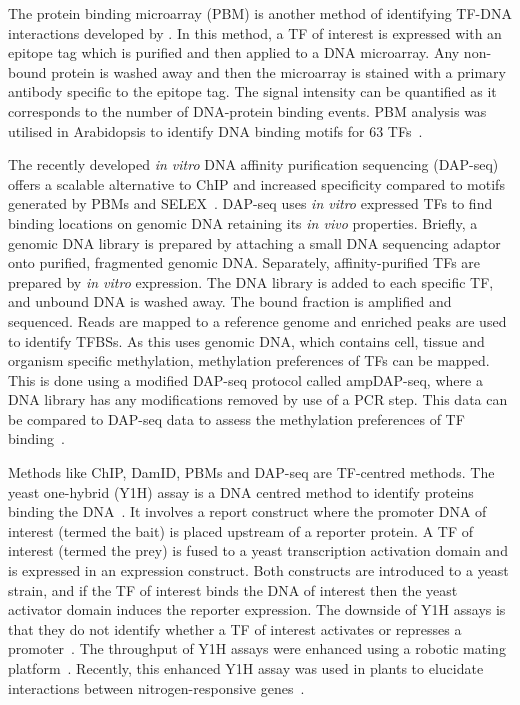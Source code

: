 The protein binding microarray (PBM) is another method of identifying TF-DNA interactions developed by \textcite*{bulykProteinBindingMicroarrays2007}. In this method, a TF of interest is expressed with an epitope tag which is purified and then applied to a DNA microarray. Any non-bound protein is washed away and then the microarray is stained with a primary antibody specific to the epitope tag. The signal intensity can be quantified as it corresponds to the number of DNA-protein binding events. PBM analysis was utilised in Arabidopsis to identify DNA binding motifs for 63 TFs~\autocite{franco-zorrillaDNAbindingSpecificitiesPlant2014}.

The recently developed \textit{in vitro} DNA affinity purification sequencing (DAP-seq) offers a scalable alternative to ChIP and increased specificity compared to motifs generated by PBMs and SELEX~\autocite{omalleyCistromeEpicistromeFeatures2016}.
DAP\hyp{}seq uses \textit{in vitro} expressed TFs to find binding locations on genomic DNA retaining its \textit{in vivo} properties.
Briefly, a genomic DNA library is prepared by attaching a small DNA sequencing adaptor onto purified, fragmented genomic DNA.
Separately, affinity\hyp{}purified TFs are prepared by \textit{in vitro} expression.
The DNA library is added to each specific TF, and unbound DNA is washed away.
The bound fraction is amplified and sequenced.
Reads are mapped to a reference genome and enriched peaks are used to identify TFBSs.
As this uses genomic DNA, which contains cell, tissue and organism specific methylation, methylation preferences of TFs can be mapped.
This is done using a modified DAP\hyp{}seq protocol called ampDAP\hyp{}seq, where a DNA library has any modifications removed by use of a PCR step.
This data can be compared to DAP\hyp{}seq data to assess the methylation preferences of TF binding~\autocite{omalleyCistromeEpicistromeFeatures2016}.

Methods like ChIP, DamID, PBMs and DAP-seq are TF\hyp{}centred methods.
The yeast one\hyp{}hybrid (Y1H) assay is a DNA centred method to identify proteins binding the DNA~\autocite{liIsolationORC6Component1993}.
It involves a report construct where the promoter DNA of interest (termed the bait) is placed upstream of a reporter protein.
A TF of interest (termed the prey) is fused to a yeast transcription activation domain and is expressed in an expression construct.
Both constructs are introduced to a yeast strain, and if the TF of interest binds the DNA of interest then the yeast activator domain induces the reporter expression.
The downside of Y1H assays is that they do not identify whether a TF of interest activates or represses a promoter~\autocite{reece-hoyesYeastOnehybridAssays2012}.
The throughput of Y1H assays were enhanced using a robotic mating platform~\autocite{reece-hoyesEnhancedYeastOnehybrid2011}.
Recently, this enhanced Y1H assay was used in plants to elucidate interactions between nitrogen-responsive genes~\autocite{gaudinierTranscriptionalRegulationNitrogenassociated2018}.

